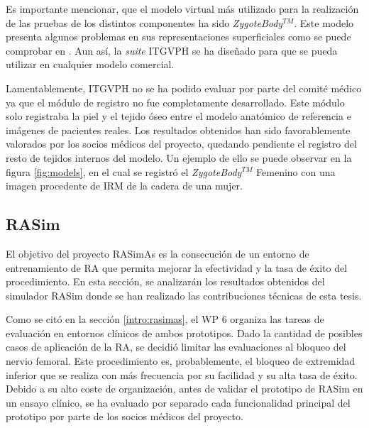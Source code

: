 Es importante mencionar, que el modelo virtual más utilizado para la realización de las pruebas de los distintos componentes ha sido \emph{ZygoteBody}$^{TM}$. Este modelo presenta algunos problemas en sus representaciones superficiales como se puede comprobar en \cite{zaitseva}. Aun así, la \emph{suite} \ac{ITGVPH} se ha diseñado para que se pueda utilizar en cualquier modelo comercial.%

Lamentablemente, \ac{ITGVPH} no se ha podido evaluar por parte del comité médico ya que el módulo de registro no fue completamente desarrollado. Este módulo solo registraba la piel y el tejido óseo entre el modelo anatómico de referencia e imágenes de pacientes reales. Los resultados obtenidos han sido favorablemente valorados por los socios médicos del proyecto, quedando pendiente el registro del resto de tejidos internos del modelo. Un ejemplo de ello se puede observar en la figura \ref{fig:models}, en el cual se registró el \emph{ZygoteBody}$^{TM}$ Femenino con una imagen procedente de \ac{IRM} de la cadera de una mujer. 







\subsection{RASim}
\label{result:rasim}


El objetivo del proyecto \ac{RASimAs} es la consecución de un entorno de entrenamiento de \ac{RA} que permita mejorar la efectividad y la tasa de éxito del procedimiento.  En esta sección, se analizarán los resultados obtenidos del simulador \ac{RASim} donde se han realizado las contribuciones técnicas de esta tesis.


Como se citó en la sección \ref{intro:rasimas}, el \acs{WP} 6 organiza las tareas de evaluación en entornos clínicos de ambos prototipos. Dado la cantidad de posibles casos de aplicación de la \ac{RA}, se decidió limitar las evaluaciones al bloqueo del nervio femoral. Este procedimiento es, probablemente, el bloqueo de extremidad inferior que se realiza con más frecuencia por su facilidad y su alta tasa de éxito. Debido a su alto coste de organización, antes de validar el prototipo de \ac{RASim} en un ensayo clínico, se ha evaluado por separado cada funcionalidad principal del prototipo por parte de los socios médicos del proyecto.


